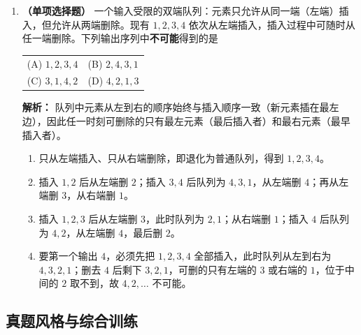 \begin{enumerate}
\item \textbf{（单项选择题）} 一个输入受限的双端队列：元素只允许从同一端（左端）插入，但允许从两端删除。现有 $1,2,3,4$ 依次从左端插入，插入过程中可随时从任一端删除。下列输出序列中\textbf{不可能}得到的是
\begin{center}
\begin{tabular}{ll}
(A) $1,2,3,4$ & (B) $2,4,3,1$ \\[6pt]
(C) $3,1,4,2$ & (D) $4,2,1,3$
\end{tabular}
\end{center}

\ifshowsolutions\par\noindent\textbf{解析：} 队列中元素从左到右的顺序始终与插入顺序一致（新元素插在最左边），因此任一时刻可删除的只有最左元素（最后插入者）和最右元素（最早插入者）。
\begin{enumerate}
\item[(A)] 只从左端插入、只从右端删除，即退化为普通队列，得到 $1,2,3,4$。
\item[(B)] 插入 $1,2$ 后从左端删 $2$；插入 $3,4$ 后队列为 $4,3,1$，从左端删 $4$；再从左端删 $3$，从右端删 $1$。
\item[(C)] 插入 $1,2,3$ 后从左端删 $3$，此时队列为 $2,1$；从右端删 $1$；插入 $4$ 后队列为 $4,2$，从左端删 $4$，最后删 $2$。
\item[(D)] 要第一个输出 $4$，必须先把 $1,2,3,4$ 全部插入，此时队列从左到右为 $4,3,2,1$；删去 $4$ 后剩下 $3,2,1$，可删的只有左端的 $3$ 或右端的 $1$，位于中间的 $2$ 取不到，故 $4,2,\ldots$ 不可能。
\end{enumerate}
\par\noindent{}\else \answerarea \fi

\end{enumerate}

\subsection{真题风格与综合训练}

